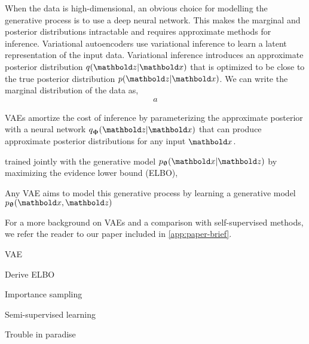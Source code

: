 When the data is high-dimensional, an obvious choice for modelling the generative process is to use a deep neural network. This makes the marginal and posterior distributions intractable and requires approximate methods for inference. Variational autoencoders \cite{kingma_autoencoding_2014,rezende_stochastic_2014} use variational inference to learn a latent representation of the input data. 
Variational inference introduces an approximate posterior distribution $q(\zb|\xb)$ that is optimized to be close to the true posterior distribution $p(\zb|\xb)$. 
We can write the marginal distribution of the data as,
%
\begin{align}
    a
\end{align}
%

VAEs amortize the cost of inference by parameterizing the approximate posterior with a neural network $q_\phib(\zb|\xb)$ that can produce approximate posterior distributions for any input $\xb$.  

trained jointly with the generative model $p_\thetab(\xb|\zb)$ by maximizing the evidence lower bound (ELBO),





Any VAE aims to model this generative process by learning a generative model $p_\thetab(\xb, \zb)$





For a more background on VAEs and a comparison with self-supervised methods, we refer the reader to our paper \textcite{borgholt_brief_2022} included in \cref{app:paper-brief}. 




VAE \cite{kingma_autoencoding_2014,rezende_stochastic_2014}

Derive ELBO

Importance sampling \cite{burda_importance_2016}

Semi-supervised learning \cite{kingma_semi-supervised_2014,maaloe_semi-supervised_2017,siddharth_learning_2017}

Trouble in paradise \cite{tomczak_trouble_2022}




